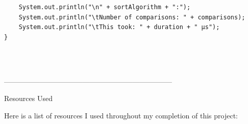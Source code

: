 \documentclass[a4paper,12pt]{article}
\begin{document}
\begin{itemize}
\begin{itemize}
\begin{verbatim}
    System.out.println("\n" + sortAlgorithm + ":");
    System.out.println("\tNumber of comparisons: " + comparisons);
    System.out.println("\tThis took: " + duration + " μs");
}


\end{verbatim}\\


\end{itemize}


\end{itemize}

\begin{center}
    -----------------------------------------------------------------------
\end{center}

\begin{center}
\begin{large}
    Resources Used
\end{large}
\end{center}

Here is a list of resources I used throughout my completion of this project:\\
    
\end{document}
